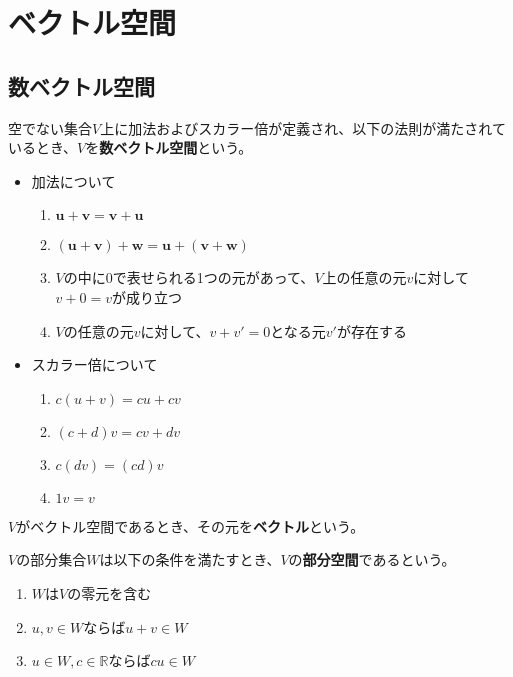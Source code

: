 \documentclass{jlreq}
\begin{document}
\section{ベクトル空間}
\subsection{数ベクトル空間}
\begin{tcolorbox}[enhanced,title=ベクトル空間の公理, 
  attach boxed title to top left, 
  colback=white!95!blue,
  colbacktitle=white!10!blue!50!black,
  drop fuzzy shadow,
  boxrule=0.25mm,
  ]
  空でない集合$V$上に加法およびスカラー倍が定義され、以下の法則が満たされているとき、$V$を\textbf{数ベクトル空間}という。

  \begin{itemize}
    \item 加法について
    \begin{enumerate}
      \item $\boldsymbol{u} + \boldsymbol{v} = \boldsymbol{v} + \boldsymbol{u}$
      \item $(\boldsymbol{u} + \boldsymbol{v}) + \boldsymbol{w} = \boldsymbol{u} + (\boldsymbol{v} + \boldsymbol{w})$
      \item $V$の中に0で表せられる1つの元があって、$V$上の任意の元$v$に対して$v + 0 = v$が成り立つ
      \item $V$の任意の元$v$に対して、$v + v' = 0$となる元$v'$が存在する
    \end{enumerate}
    \item スカラー倍について
    \begin{enumerate}
      \item $c(u + v) = cu + cv$
      \item $(c + d)v = cv + dv$
      \item $c(dv) = (cd)v$
      \item $1v = v$
    \end{enumerate}
    \end{itemize}
\end{tcolorbox}

$V$がベクトル空間であるとき、その元を\textbf{ベクトル}という。

\begin{tcolorbox}[enhanced,title=部分空間, 
  attach boxed title to top left, 
  colback=white!95!blue,
  colbacktitle=white!10!blue!50!black,
  drop fuzzy shadow,
  boxrule=0.25mm,
  ]
  $V$の部分集合$W$は以下の条件を満たすとき、$V$の\textbf{部分空間}であるという。

  \begin{enumerate}
    \item $W$は$V$の零元を含む
    \item $u, v \in W$ならば$u + v \in W$
    \item $u \in W, c \in \mathbb{R}$ならば$cu \in W$
  \end{enumerate}
\end{tcolorbox}
\end{document}
